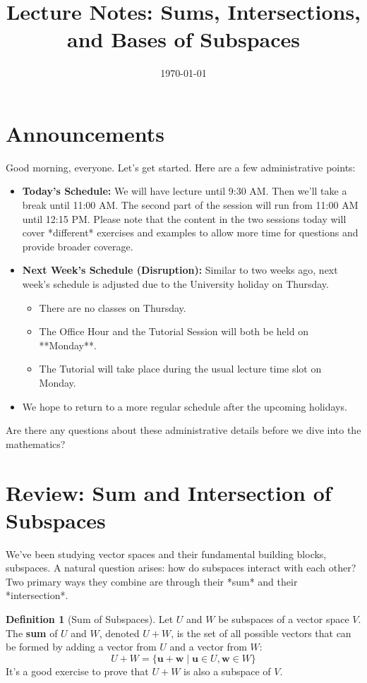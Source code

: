 \documentclass[11pt]{article}
\title{Lecture Notes: Sums, Intersections, and Bases of Subspaces}
\date{\today} %
\theoremstyle{definition}
\newtheorem{definition}[theorem]{Definition}
\theoremstyle{remark}
\newcommand{\vecu}{\mathbf{u}}
\newcommand{\vecw}{\mathbf{w}}
\begin{document}
\maketitle

\section*{Announcements}
Good morning, everyone. Let's get started. Here are a few administrative points:

\begin{itemize}
    \item \textbf{Today's Schedule:} We will have lecture until 9:30 AM. Then we'll take a break until 11:00 AM. The second part of the session will run from 11:00 AM until 12:15 PM. Please note that the content in the two sessions today will cover *different* exercises and examples to allow more time for questions and provide broader coverage.
    \item \textbf{Next Week's Schedule (Disruption):} Similar to two weeks ago, next week's schedule is adjusted due to the University holiday on Thursday.
        \begin{itemize}
            \item There are no classes on Thursday.
            \item The Office Hour and the Tutorial Session will both be held on **Monday**.
            \item The Tutorial will take place during the usual lecture time slot on Monday.
        \end{itemize}
    \item We hope to return to a more regular schedule after the upcoming holidays.
\end{itemize}
Are there any questions about these administrative details before we dive into the mathematics?

\section{Review: Sum and Intersection of Subspaces}

We've been studying vector spaces and their fundamental building blocks, subspaces. A natural question arises: how do subspaces interact with each other? Two primary ways they combine are through their *sum* and their *intersection*.

\begin{definition}[Sum of Subspaces]
Let $U$ and $W$ be subspaces of a vector space $V$. The \textbf{sum} of $U$ and $W$, denoted $U+W$, is the set of all possible vectors that can be formed by adding a vector from $U$ and a vector from $W$:
\[ U+W = \{ \vecu + \vecw \mid \vecu \in U, \vecw \in W \} \]
It's a good exercise to prove that $U+W$ is also a subspace of $V$.
\end{definition}
\end{document}
